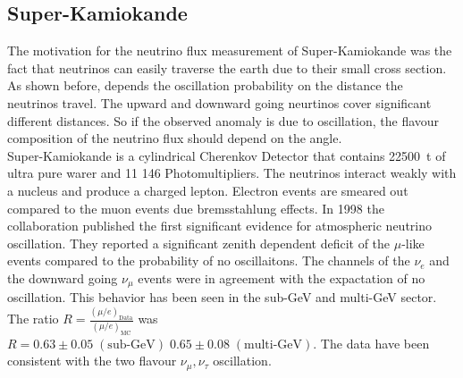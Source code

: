 \subsection{Super-Kamiokande}
The motivation for the neutrino flux measurement of Super-Kamiokande was the fact that neutrinos can easily traverse the earth due to their small cross section. As shown before, depends the oscillation probability on the distance the neutrinos travel. The upward and downward going neurtinos cover significant different distances. So if the observed anomaly is due to oscillation, the flavour composition of the neutrino flux should depend on the angle.\\
Super-Kamiokande is a cylindrical Cherenkov Detector that contains \SI{22500}{\tonne} of ultra pure warer and 11 146 Photomultipliers. The neutrinos interact weakly with a nucleus and produce a charged lepton. Electron events are smeared out compared to the muon events due bremsstahlung effects. In 1998 the collaboration published the first significant evidence for atmospheric neutrino oscillation. They reported a significant zenith dependent deficit of the $\mu$-like events compared to the probability of no oscillaitons. The channels of the $\nu_e$ and the downward going $\nu_{\mu}$ events were in agreement with the expactation of no oscillation. This behavior has been seen in the sub-\si{\giga\electronvolt} and multi-\si{\giga\electronvolt} sector. The ratio $R=\frac{(\mu/e)_{\text{Data}}}{(\mu/e)_{\text{MC}}}$ was $R=0.63 \pm 0.05 \; (\text{sub-}\si{\giga\electronvolt}) \; 0.65\pm 0.08 \; (\text{multi-}\si{\giga\electronvolt})$.
The data have been consistent with the two flavour $\nu_{\mu},\nu_{\tau}$ oscillation.

